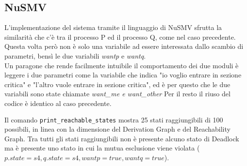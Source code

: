 \documentclass[a4paper]{article}
\begin{document}
\subsection{NuSMV}
\label{SUBSEC:3.6NuSMV}
L'implementazione del sistema tramite il linguaggio di NuSMV sfrutta la similarità che c'è tra il processo P ed il processo Q, come nel caso precedente.
Questa volta però non è solo una variabile ad essere interessata dallo scambio di parametri, bensì le due variabili \textit{wantp} e \textit{wantq}.\\
Un paragone che rende facilmente intuibile il comportamento dei due moduli è leggere i due parametri come la variabile che indica "io voglio entrare in sezione critica" e "l'altro vuole entrare in sezione critica", ed è per questo che le due variabili sono state chiamate \textit{want\_me \textit{e} want\_other}
Per il resto il riuso del codice è identico al caso precedente.

Il comando \texttt{print\_reachable\_states} mostra 25 stati raggiungibili di 100 possibili, in linea con la dimensione del Derivation Graph e del Reachability Graph.
Tra tutti gli stati raggiungibili non è presente alcuno stato di Deadlock ma è presente uno stato in cui la mutua esclusione viene violata ($p.state=s4,q.state=s4,wantp=true,wantq=true$).
\end{document}
